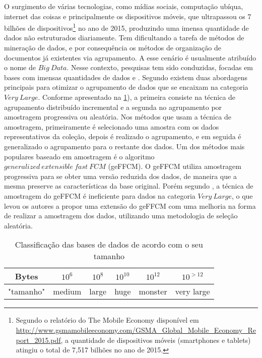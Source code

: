 O surgimento de várias tecnologias, como mídias sociais, computação ubíqua, internet das coisas e
principalmente os dispositivos móveis, que ultrapassou os 7 bilhões de dispositivos\footnote{Segundo
  o relatório do The Mobile Economy disponível em
  \url{http://www.gsmamobileeconomy.com/GSMA_Global_Mobile_Economy_Report_2015.pdf}, a quantidade de
dispositivos móveis (smartphones e tablets) atingiu o total de 7,517 bilhões no ano de 2015.} no ano
de 2015, produzindo uma imensa quantidade de dados não estruturados diariamente. Tem dificultando a
tarefa de métodos de mineração de dados, e por consequência os métodos de organização de documentos
já existentes via agrupamento. A esse cenário é usualmente atribuído o nome de $Big\ Data$. Nesse
contexto, pesquisas tem sido conduzidas, focadas em bases com imensas quantidades de dados
\cite{Havens2012} e \cite{Kumar2015}. Segundo \cite{Havens2012} existem duas abordagens principais
para otimizar o agrupamento de dados que se encaixam na categoria $Very\ Large$. Conforme
apresentado na  \ref{table:datasize}), a primeira consiste na técnica de agrupamento distribuído
incremental e a segunda no agrupamento por amostragem progressiva ou aleatória. Nos métodos que usam
a técnica de amostragem, primeiramente é selecionado uma amostra com os dados representativos da
coleção, depois é realizado o agrupamento, e em seguida é generalizado o agrupamento para o restante
dos dados. Um dos métodos mais populares baseado em amostragem é o algoritmo $generalized\
extensible\ fast\ FCM$ (geFFCM)\cite{Havens2012}. O geFFCM utiliza amostragem progressiva para se
obter uma versão reduzida dos dados, de maneira que a mesma preserve as características da base
original. Porém segundo \cite{Havens2012}, a técnica de amostragem do geFFCM é ineficiente para
dados na categoria $Very\ Large$, o que levou os autores a propor uma extensão do geFFCM com uma
melhoria na forma de realizar a amostragem dos dados, utilizando uma metodologia de seleção
aleatória.

\begin{table}[!htp]
  \centering
  \begin{tabular}{ |c|c c c c c|}
    \hline
    Bytes & $10^6$ & $10^8$ & $10^{10}$ & $10^{12}$ & $10^{>12}$ \\
    \hline
    "tamanho" & medium & large & huge & monster & very large \\
    \hline
  \end{tabular}
  \caption{Classificação das bases de dados de acordo com o seu tamanho\cite{Havens2012}}
  \label{table:datasize}
\end{table}

